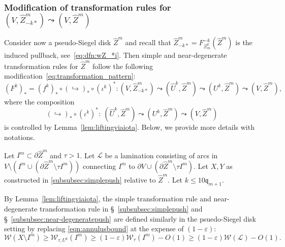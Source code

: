 \documentclass{amsart}
\newcommand{\1}{{\mathbb 1 }}
\newcommand{\Width}{{\mathcal W}}
\newcommand\LL{{\mathcal L}}
\newcommand{\wZ}{{\widehat Z}}
\newcommand{\qq}{\mathfrak{q}}
\theoremstyle{remark}
\numberwithin{equation}{section}
\theoremstyle{definition}
\begin{document}
\subsubsection{Modification of transformation rules for $(V, \wZ^m_{-k*})\leadsto (V, \wZ^m)$}
\label{sss:CL:wZ^m}
Consider now a pseudo-Siegel disk $\wZ^m$ and recall that $\wZ^m_{-k*}=F^{-k}_{\Xi_m^k}(\wZ^m)$ is the induced pullback, see~\eqref{eq:dfn:wZ_*i}. Then simple and near-degenerate transformation rules for $\wZ^m$ follow the following modification~\eqref{eq:transformation_pattern}: 
\begin{equation}
\label{eq:transformation_pattern:wZ}
     (F^k)_*=(f^k)_*\circ (\hookrightarrow)_*\circ (\iota^k)^*\colon (V,\wZ^m_{-k*})\leadsto(\widehat U^k,\wZ^m)\leadsto(U^k,\wZ^m)\leadsto (V,\wZ^m),
\end{equation}
where the composition
\[(\hookrightarrow)_*\circ (\iota^k)^*\colon \ (\widehat U^k,\wZ^m)\leadsto(U^k,\wZ^m)\leadsto (V,\wZ^m)\]
is controlled by Lemma~\ref{lem:liftingviaiota}.
Below, we provide more details with notations.


Let $I^m\subset \partial \wZ^m$ and $\tau > 1$. Let $\LL$ be a lamination consisting of arcs in $V \setminus (I^m \cup (\partial \wZ^m \setminus \tau I^m))$ connecting $I^m$ to $\partial V \cup (\partial \wZ^m \setminus \tau I^m)$.
Let $X, Y$ as constructed in \ref{subsubsec:simplepush} relative to $\wZ^m$. Let $k \leq 10\qq_{m+1}$.

By Lemma~\ref{lem:liftingviaiota}, the simple transformation rule and near-degenerate transformation rule in \S~\ref{subsubsec:simplepush} and \S~\ref{subsubsec:near-degeneratepush} are defined similarly in the psuedo-Siegel disk setting by replacing \eqref{eqn:annulusbound} at the expense of $(1-\varepsilon)$:
\begin{equation}\label{eqn:psuedoannulusbound}
\Width(X\setminus I^m) \ge \Width_{\tau, U^k}(I^m) \ge (1-\varepsilon) \Width_{\tau}(I^m) - O(1) \ge (1-\varepsilon) \Width(\LL) - O(1).
\end{equation}
\end{document}
